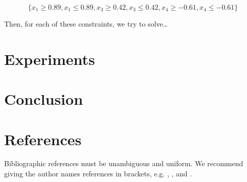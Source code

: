 \documentclass[12pt]{article}
\begin{document}
\[
\{x_1 \ge 0.89, x_1 \le 0.89, x_3 \ge 0.42, x_3 \le 0.42, x_4 \ge -0.61, x_4 \le -0.61\}
\]

Then, for each of these constraints, we try to solve\dots


\section{Experiments}





\section{Conclusion}

\section{References}


Bibliographic references must be unambiguous and uniform.  We recommend giving
the author names references in brackets, e.g. \cite{knuth:84},
\cite{boulic:91}, and \cite{smith:99}.




\end{document}
